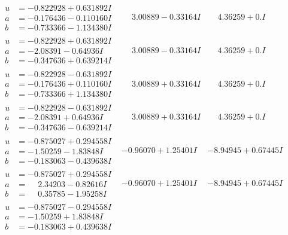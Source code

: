 \documentclass[1p]{elsarticle_modified}
\theoremstyle{definition}
\begin{document}
$$\begin{array}{c|c|c}
\begin{aligned}
u &= -0.822928 + 0.631892 I \\
a &= -0.176436 - 0.110160 I \\
b &= -0.733366 - 1.134380 I\end{aligned}
 & \phantom{-}3.00889 - 0.33164 I & \phantom{-}4.36259 + 0. I\phantom{ +0.000000I} \\ \hline\begin{aligned}
u &= -0.822928 + 0.631892 I \\
a &= -2.08391 - 0.64936 I \\
b &= -0.347636 + 0.639214 I\end{aligned}
 & \phantom{-}3.00889 - 0.33164 I & \phantom{-}4.36259 + 0. I\phantom{ +0.000000I} \\ \hline\begin{aligned}
u &= -0.822928 - 0.631892 I \\
a &= -0.176436 + 0.110160 I \\
b &= -0.733366 + 1.134380 I\end{aligned}
 & \phantom{-}3.00889 + 0.33164 I & \phantom{-}4.36259 + 0. I\phantom{ +0.000000I} \\ \hline\begin{aligned}
u &= -0.822928 - 0.631892 I \\
a &= -2.08391 + 0.64936 I \\
b &= -0.347636 - 0.639214 I\end{aligned}
 & \phantom{-}3.00889 + 0.33164 I & \phantom{-}4.36259 + 0. I\phantom{ +0.000000I} \\ \hline\begin{aligned}
u &= -0.875027 + 0.294558 I \\
a &= -1.50259 - 1.83848 I \\
b &= -0.183063 - 0.439638 I\end{aligned}
 & -0.96070 + 1.25401 I & -8.94945 + 0.67445 I \\ \hline\begin{aligned}
u &= -0.875027 + 0.294558 I \\
a &= \phantom{-}2.34203 - 0.82616 I \\
b &= \phantom{-}0.35785 - 1.95258 I\end{aligned}
 & -0.96070 + 1.25401 I & -8.94945 + 0.67445 I \\ \hline\begin{aligned}
u &= -0.875027 - 0.294558 I \\
a &= -1.50259 + 1.83848 I \\
b &= -0.183063 + 0.439638 I\end{aligned}

\end{array}$$
\end{document}
